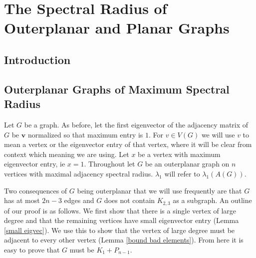 \chapter{The Spectral Radius of Outerplanar and Planar Graphs}
\section{Introduction}
\section{Outerplanar Graphs of Maximum Spectral Radius}\label{outerplanar}
Let $G$ be a graph. As before, let the first eigenvector of the adjacency matrix of $G$ be $\textbf{v}$ normalized so that maximum entry is $1$. For $v\in V(G)$ we will use $v$ to mean a vertex or the eigenvector entry of that vertex, where it will be clear from context which meaning we are using. Let $x$ be a vertex with maximum eigenvector entry, ie $x=1$.  Throughout let $G$ be an outerplanar graph on $n$ vertices with maximal adjacency spectral radius.  $\lambda_1$ will refer to $\lambda_1(A(G))$. 

Two consequences of $G$ being outerplanar that we will use frequently are that $G$ has at most $2n-3$ edges and $G$ does not contain $K_{2,3}$ as a subgraph. An outline of our proof is as follows. We first show that there is a single vertex of large degree and that the remaining vertices have small eigenvector entry (Lemma \ref{small eigvec}). We use this to show that the vertex of large degree must be adjacent to every other vertex (Lemma \ref{bound bad elements}). From here it is easy to prove that $G$ must be $K_1+P_{n-1}$.


